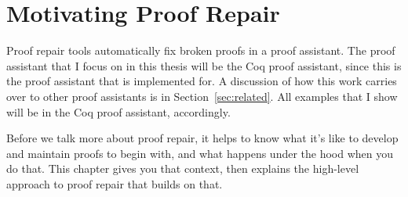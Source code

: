 \chapter{Motivating Proof Repair}

Proof repair tools automatically fix broken proofs in a proof assistant.
The proof assistant that I focus on in this thesis will be the Coq proof assistant,
since this is the proof assistant that \sysname is implemented for.
A discussion of how this work carries over to other proof assistants is in Section~\ref{sec:related}.
All examples that I show will be in the Coq proof assistant, accordingly.


Before we talk more about proof repair, it helps to know what it's like to develop and maintain proofs to begin with, and what happens under the hood when you do that. This chapter gives you that context, then explains the high-level approach to proof repair that builds on that.






